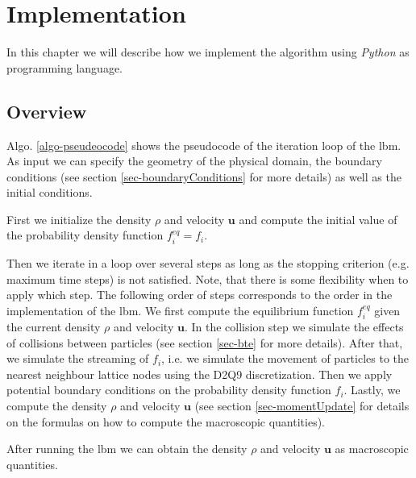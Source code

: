 \documentclass[a4paper,11pt, footsepline]{book}
\begin{document}
\chapter{Implementation}\label{ch-implementation}
In this chapter we will describe how we implement the algorithm using \textit{Python} as programming language.
\section{Overview}
Algo. \ref{algo-pseudeocode} shows the pseudocode of the iteration loop of the \ac{lbm}. As input we can specify the geometry of the physical domain, the boundary conditions (see section \ref{sec-boundaryConditions} for more details) as well as the initial conditions. 

First we initialize the density $\rho$ and velocity $\mathbf{u}$ and compute the initial value of the probability density function $f_{i}^{eq}=f_{i}$. 

Then we iterate in a loop over several steps as long as the stopping criterion (e.g. maximum time steps) is not satisfied. Note, that there is some flexibility when to apply which step. The following order of steps corresponds to the order in the implementation of the \ac{lbm}. We first compute the equilibrium function $f_{i}^{eq}$ given the current density $\rho$ and velocity $\mathbf{u}$. In the collision step we simulate the effects of collisions between particles (see section \ref{sec-bte} for more details). After that, we simulate the streaming of $f_i$, i.e. we simulate the movement of particles to the nearest neighbour lattice nodes using the D2Q9 discretization. Then we apply potential boundary conditions on the probability density function $f_i$. Lastly, we compute the density $\rho$ and velocity $\mathbf{u}$ (see section \ref{sec-momentUpdate} for details on the formulas on how to compute the macroscopic quantities).

After running the \ac{lbm} we can obtain the density $\rho$ and velocity $\mathbf{u}$ as macroscopic quantities.
\end{document}
